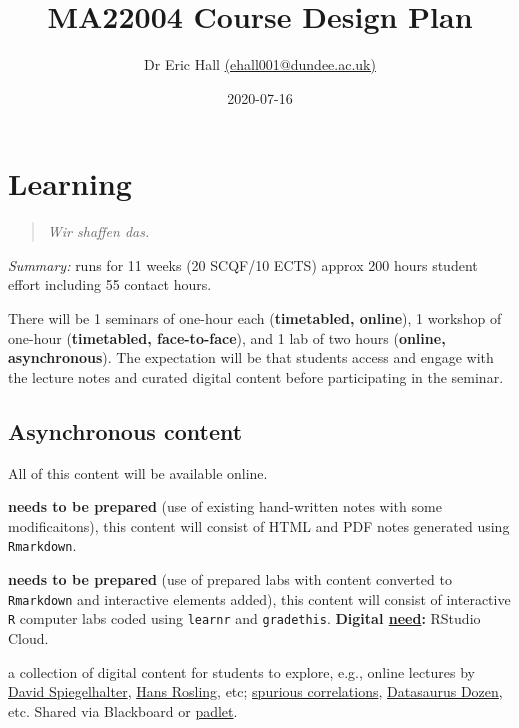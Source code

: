 \documentclass[
]{article}
\title{MA22004 Course Design Plan}
\author{Dr Eric Hall \href{mailto:ehall001@dundee.ac.uk}{(ehall001@dundee.ac.uk)}}
\date{2020-07-16}
\providecommand{\tightlist}{%
  \setlength{\itemsep}{0pt}\setlength{\parskip}{0pt}}
\begin{document}
\maketitle

{
\setcounter{tocdepth}{2}
\tableofcontents
}
\hypertarget{learning}{%
\section{Learning}\label{learning}}

\begin{quote}
\emph{Wir shaffen das.}
\end{quote}

\emph{Summary:} runs for 11 weeks (20 SCQF/10 ECTS) approx 200 hours student effort including 55 contact hours.

There will be 1 seminars of one-hour each (\textbf{timetabled, online}), 1 workshop of one-hour (\textbf{timetabled, face-to-face}), and 1 lab of two hours (\textbf{online, asynchronous}). The expectation will be that students access and engage with the lecture notes and curated digital content before participating in the seminar.

\hypertarget{asynchronous-content}{%
\subsection*{Asynchronous content}\label{asynchronous-content}}

All of this content will be available online.

\begin{description}
\tightlist
\item[Course notes (ACQUIRING)]
\textbf{needs to be prepared} (use of existing hand-written notes with some modificaitons), this content will consist of HTML and PDF notes generated using \texttt{Rmarkdown}.
\item[Interactive computer labs (PRODUCING, PRACTICING)]
\textbf{needs to be prepared} (use of prepared labs with content converted to \texttt{Rmarkdown} and interactive elements added), this content will consist of interactive \texttt{R} computer labs coded using \texttt{learnr} and \texttt{gradethis}. \textbf{Digital \protect\hyperlink{needs}{need}:} RStudio Cloud.
\item[Curated digital content (INQUIRING)]
a collection of digital content for students to explore, e.g., online lectures by \href{https://www.youtube.com/watch?v=a1PtQ67urG4}{David Spiegelhalter}, \href{https://www.youtube.com/watch?v=hVimVzgtD6w}{Hans Rosling}, etc; \href{http://tylervigen.com/spurious-correlations}{spurious correlations}, \href{\%5Bhttps://www.autodeskresearch.com/publications/samestats}{Datasaurus Dozen}, etc. Shared via Blackboard or \href{https://padlet.com/}{padlet}.
\end{description}
\end{document}
